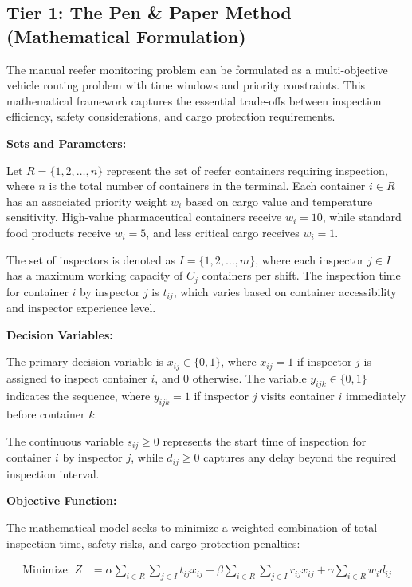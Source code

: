 \documentclass{article}
\begin{document}
\subsection{Tier 1: The Pen \& Paper Method (Mathematical Formulation)}

The manual reefer monitoring problem can be formulated as a multi-objective vehicle routing problem with time windows and priority constraints. This mathematical framework captures the essential trade-offs between inspection efficiency, safety considerations, and cargo protection requirements.

\textbf{Sets and Parameters:}

Let $R = \{1, 2, \ldots, n\}$ represent the set of reefer containers requiring inspection, where $n$ is the total number of containers in the terminal. Each container $i \in R$ has an associated priority weight $w_i$ based on cargo value and temperature sensitivity. High-value pharmaceutical containers receive $w_i = 10$, while standard food products receive $w_i = 5$, and less critical cargo receives $w_i = 1$.

The set of inspectors is denoted as $I = \{1, 2, \ldots, m\}$, where each inspector $j \in I$ has a maximum working capacity of $C_j$ containers per shift. The inspection time for container $i$ by inspector $j$ is $t_{ij}$, which varies based on container accessibility and inspector experience level.

\textbf{Decision Variables:}

The primary decision variable is $x_{ij} \in \{0, 1\}$, where $x_{ij} = 1$ if inspector $j$ is assigned to inspect container $i$, and 0 otherwise. The variable $y_{ijk} \in \{0, 1\}$ indicates the sequence, where $y_{ijk} = 1$ if inspector $j$ visits container $i$ immediately before container $k$.

The continuous variable $s_{ij} \geq 0$ represents the start time of inspection for container $i$ by inspector $j$, while $d_{ij} \geq 0$ captures any delay beyond the required inspection interval.

\textbf{Objective Function:}

The mathematical model seeks to minimize a weighted combination of total inspection time, safety risks, and cargo protection penalties:

\begin{align}
\text{Minimize: } Z &= \alpha \sum_{i \in R} \sum_{j \in I} t_{ij} x_{ij} + \beta \sum_{i \in R} \sum_{j \in I} r_{ij} x_{ij} + \gamma \sum_{i \in R} w_i d_{ij}
\end{align}
\end{document}
